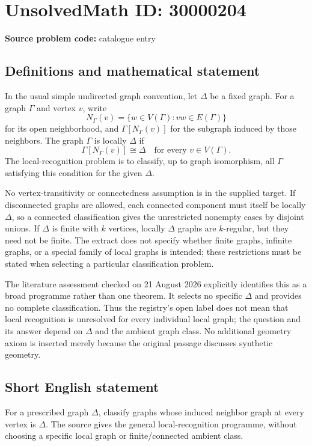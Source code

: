 \documentclass[11pt]{article}
\begin{document}
\section*{UnsolvedMath ID: 30000204}
\textbf{Source problem code:} catalogue entry
\subsection{Definitions and mathematical statement}
In the usual simple undirected graph convention, let $\Delta$ be a fixed graph. For a graph $\Gamma$ and vertex $v$, write
\[
 N_\Gamma(v)=\{w\in V(\Gamma):vw\in E(\Gamma)\}
\]
for its open neighborhood, and $\Gamma[N_\Gamma(v)]$ for the subgraph induced by those neighbors. The graph $\Gamma$ is locally $\Delta$ if
\[
 \Gamma[N_\Gamma(v)]\cong\Delta\quad\text{for every }v\in V(\Gamma).
\]
The local-recognition problem is to classify, up to graph isomorphism, all $\Gamma$ satisfying this condition for the given $\Delta$.

No vertex-transitivity or connectedness assumption is in the supplied target. If disconnected graphs are allowed, each connected component must itself be locally $\Delta$, so a connected classification gives the unrestricted nonempty cases by disjoint unions. If $\Delta$ is finite with $k$ vertices, locally $\Delta$ graphs are $k$-regular, but they need not be finite. The extract does not specify whether finite graphs, infinite graphs, or a special family of local graphs is intended; these restrictions must be stated when selecting a particular classification problem.

The literature assessment checked on 21 August 2026 explicitly identifies this as a broad programme rather than one theorem. It selects no specific $\Delta$ and provides no complete classification. Thus the registry's open label does not mean that local recognition is unresolved for every individual local graph; the question and its answer depend on $\Delta$ and the ambient graph class. No additional geometry axiom is inserted merely because the original passage discusses synthetic geometry.
\subsection{Short English statement}
For a prescribed graph $\Delta$, classify graphs whose induced neighbor graph at every vertex is $\Delta$. The source gives the general local-recognition programme, without choosing a specific local graph or finite/connected ambient class.
\end{document}
